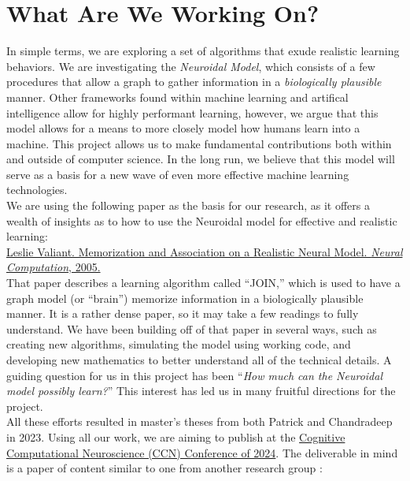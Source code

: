 \documentclass{article}
\begin{document}
\newpage

\section*{What Are We Working On?}

\hfill 

In simple terms, we are exploring a set of algorithms that exude realistic learning behaviors. We are investigating the \emph{Neuroidal Model}, which consists of a few procedures that allow a graph to gather information in a \textit{biologically plausible} manner. Other frameworks found within machine learning and artifical intelligence allow for highly performant learning, however, we argue that this model allows for a means to more closely model how humans learn into a machine. This project allows us to make fundamental contributions both within and outside of computer science. In the long run, we believe that this model will serve as a basis for a new wave of even more effective machine learning technologies. \\

We are using the following paper \cite{valiant2005} as the basis for our research, as it offers a wealth of insights as to how to use the Neuroidal model for effective and realistic learning: \\

\noindent \href{https://doi.org/10.1162/0899766053019890}{Leslie Valiant. Memorization and Association on a Realistic Neural Model. \textit{Neural Computation}, 2005.} \\

\noindent That paper describes a learning algorithm called ``JOIN,'' which is used to have a graph model (or ``brain'') memorize information in a biologically plausible manner. It is a rather dense paper, so it may take a few readings to fully understand. We have been building off of that paper in several ways, such as creating new algorithms, simulating the model using working code, and developing new mathematics to better understand all of the technical details. A guiding question for us in this project has been ``\textit{How much can the Neuroidal model possibly learn?}'' This interest has led us in many fruitful directions for the project. \\

All these efforts resulted in master's theses from both Patrick \cite{perrine2023} and Chandradeep \cite{chowdhury2023} in 2023. Using all our work, we are aiming to publish at the \href{https://2024.ccneuro.org/}{Cognitive Computational Neuroscience (CCN) Conference of 2024}. The deliverable in mind is a paper of content similar to one from another research group \cite{papadim2015}: \\
\end{document}
